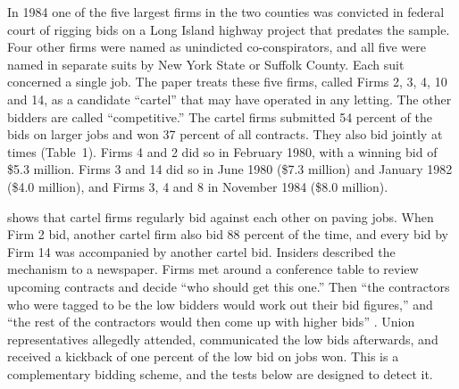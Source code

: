 In 1984 one of the five largest firms in the two counties was convicted in federal court of rigging bids on a Long
Island highway project that predates the sample. Four other firms were named as unindicted co-conspirators, and all
five were named in separate suits by New York State or Suffolk County. Each suit concerned a single job. The paper
treats these five firms, called Firms 2, 3, 4, 10 and 14, as a candidate ``cartel'' that may have operated in any
letting. The other bidders are called ``competitive.'' The cartel firms submitted 54 percent of the bids on larger
jobs and won 37 percent of all contracts. They also bid jointly at times (Table~1). Firms 4 and 2 did so in February
1980, with a winning bid of \$5.3 million. Firms 3 and 14 did so in June 1980 (\$7.3 million) and January 1982
(\$4.0 million), and Firms 3, 4 and 8 in November 1984 (\$8.0 million).

 shows that cartel firms regularly bid against each other on paving jobs. When Firm 2 bid,
another cartel firm also bid 88 percent of the time, and every bid by Firm 14 was accompanied by another cartel bid.
Insiders described the mechanism to a newspaper. Firms met around a conference table to review upcoming contracts
and decide ``who should get this one.'' Then ``the contractors who were tagged to be the low bidders would work out
their bid figures,'' and ``the rest of the contractors would then come up with higher bids'' \citep[p.~17]{PorterZona1993}.
Union representatives allegedly attended, communicated the low bids afterwards, and received a kickback of one percent of
the low bid on jobs won. This is a complementary bidding scheme, and the tests below are designed to detect it.

